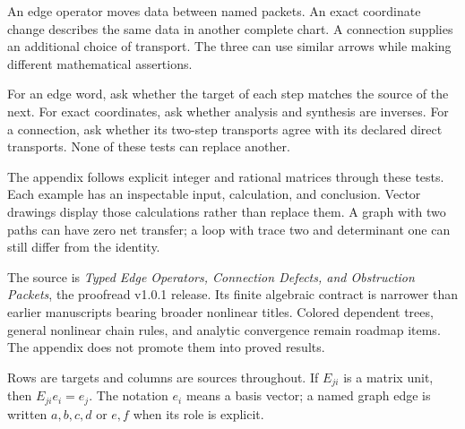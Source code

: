 An edge operator moves data between named packets. An exact coordinate change describes the same data in another complete chart. A connection supplies an additional choice of transport. The three can use similar arrows while making different mathematical assertions.


For an edge word, ask whether the target of each step matches the source of the next. For exact coordinates, ask whether analysis and synthesis are inverses. For a connection, ask whether its two-step transports agree with its declared direct transports. None of these tests can replace another.

The appendix follows explicit integer and rational matrices through these tests. Each example has an inspectable input, calculation, and conclusion. Vector drawings display those calculations rather than replace them. A graph with two paths can have zero net transfer; a loop with trace two and determinant one can still differ from the identity.

The source is \emph{Typed Edge Operators, Connection Defects, and Obstruction Packets}, the proofread v1.0.1 release. Its finite algebraic contract is narrower than earlier manuscripts bearing broader nonlinear titles. Colored dependent trees, general nonlinear chain rules, and analytic convergence remain roadmap items. The appendix does not promote them into proved results.


Rows are targets and columns are sources throughout. If $E_{ji}$ is a matrix unit, then $E_{ji}e_i=e_j$. The notation $e_i$ means a basis vector; a named graph edge is written $a,b,c,d$ or $e,f$ when its role is explicit.

